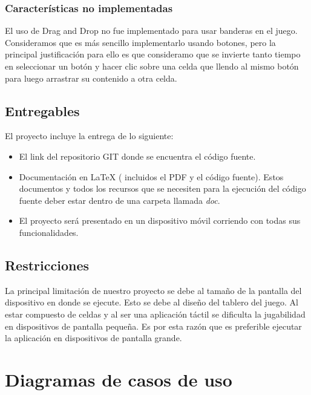 \documentclass[11pt]{article} %
\begin{document}
\subsubsection{Caracter\' isticas no implementadas}
El uso de Drag and Drop no fue implementado para usar banderas en el juego. Consideramos que es m\' as sencillo implementarlo usando botones, pero la principal justificaci\'on para ello es que consideramo que se invierte tanto tiempo en seleccionar un bot\' on y hacer clic sobre una celda que llendo al mismo bot\' on para luego arrastrar su contenido a otra celda.

\subsection{Entregables}
El proyecto incluye la entrega de lo siguiente:

\begin{itemize}
\item El link del repositorio GIT donde se encuentra el c\'odigo fuente.
\item Documentación en LaTeX ( incluidos el PDF y el c\'odigo fuente). Estos documentos y todos los recursos que se necesiten para la ejecuci\'on del c\'odigo fuente deber estar dentro de una carpeta llamada \textsl{doc}.
\item  El proyecto ser\'a presentado en un dispositivo m\'ovil corriendo con todas sus funcionalidades.
\end{itemize}

\subsection{Restricciones}
La principal limitaci\'on de nuestro proyecto se debe al tama\~no de la pantalla del dispositivo en donde se ejecute.
Esto se debe al dise\~no del tablero del juego. Al estar compuesto de celdas y al ser una aplicaci\'on t\'actil se dificulta la jugabilidad en dispositivos de pantalla peque\~na.
Es por esta raz\'on que es preferible ejecutar la aplicaci\'on en dispositivos de pantalla grande.

\newpage
\thispagestyle{empty}

\section{Diagramas de casos de uso }
\end{document}
